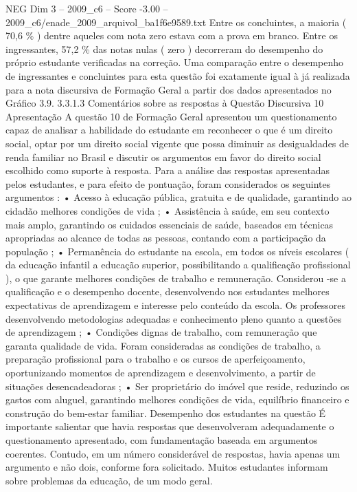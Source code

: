\begin{textsample}{NEG Dim 3 – 2009\_c6 – Score -3.00 – 2009\_c6/enade\_2009\_arquivol\_ba1f6e9589.txt}
Entre os concluintes, a maioria ( 70,6 \% ) dentre aqueles com nota zero estava com a prova em branco.
Entre os ingressantes, 57,2 \% das notas nulas ( zero ) decorreram do desempenho do próprio estudante verificadas na correção.
Uma comparação entre o desempenho de ingressantes e concluintes para esta questão foi exatamente igual à já realizada para a nota discursiva de Formação Geral a partir dos dados apresentados no Gráfico 3.9. 3.3.1.3 Comentários sobre as respostas à Questão Discursiva 10 Apresentação A questão 10 de Formação Geral apresentou um questionamento capaz de analisar a habilidade do estudante em reconhecer o que é um direito social, optar por um direito social vigente que possa diminuir as desigualdades de renda familiar no Brasil e discutir os argumentos em favor do direito social escolhido como suporte à resposta.
Para a análise das respostas apresentadas pelos estudantes, e para efeito de pontuação, foram considerados os seguintes argumentos : • Acesso à educação pública, gratuita e de qualidade, garantindo ao cidadão melhores condições de vida ; • Assistência à saúde, em seu contexto mais amplo, garantindo os cuidados essenciais de saúde, baseados em técnicas apropriadas ao alcance de todas as pessoas, contando com a participação da população ; • Permanência do estudante na escola, em todos os níveis escolares ( da educação infantil a educação superior, possibilitando a qualificação profissional ), o que garante melhores condições de trabalho e remuneração.
Considerou -se a qualificação e o desempenho docente, desenvolvendo nos estudantes melhores expectativas de aprendizagem e interesse pelo conteúdo da escola.
Os professores desenvolvendo metodologias adequadas e conhecimento pleno quanto a questões de aprendizagem ; • Condições dignas de trabalho, com remuneração que garanta qualidade de vida.
Foram consideradas as condições de trabalho, a preparação profissional para o trabalho e os cursos de aperfeiçoamento, oportunizando momentos de aprendizagem e desenvolvimento, a partir de situações desencadeadoras ; • Ser proprietário do imóvel que reside, reduzindo os gastos com aluguel, garantindo melhores condições de vida, equilíbrio financeiro e construção do bem-estar familiar.
Desempenho dos estudantes na questão É importante salientar que havia respostas que desenvolveram adequadamente o questionamento apresentado, com fundamentação baseada em argumentos coerentes.
Contudo, em um número considerável de respostas, havia apenas um argumento e não dois, conforme fora solicitado.
Muitos estudantes informam sobre problemas da educação, de um modo geral.

\end{textsample}
